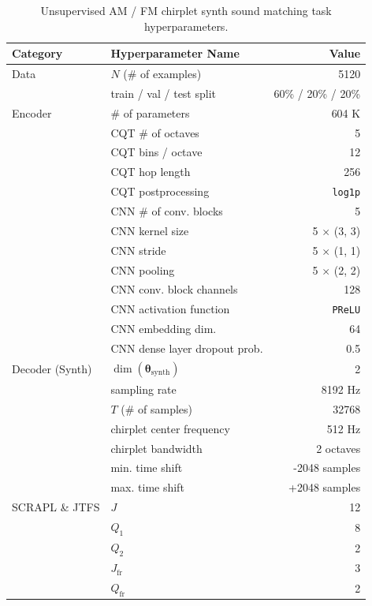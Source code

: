 \documentclass{article} %
\theoremstyle{plain}
\theoremstyle{definition}
\theoremstyle{remark}
\begin{document}
\begin{table}[H]
\centering
\caption{Unsupervised AM / FM chirplet synth sound matching task hyperparameters.}
\label{tab:chirplet_hyperparams}
\vspace{3pt}
\begin{tabular}{
    llr
}
    \toprule
    \bf{Category} & \bf{Hyperparameter Name} & \bf{Value} \\
    \midrule
    Data & $N$ (\# of examples) & 5120 \\
    & train / val / test split & 60\% / 20\% / 20\% \\
    \midrule
    Encoder & \# of parameters & 604 K \\
    & CQT \# of octaves & 5 \\
    & CQT bins / octave & 12 \\
    & CQT hop length & 256 \\
    & CQT postprocessing & \texttt{log1p} \\
    & CNN \# of conv. blocks & 5 \\
    & CNN kernel size & 5 $\times$ (3, 3) \\
    & CNN stride & 5 $\times$ (1, 1) \\
    & CNN pooling & 5 $\times$ (2, 2) \\
    & CNN conv. block channels & 128 \\
    & CNN activation function & \texttt{PReLU} \\
    & CNN embedding dim. & 64 \\
    & CNN dense layer dropout prob. & 0.5 \\
    \midrule
    Decoder (Synth) & $\dim(\boldsymbol{\theta_{\mathrm{synth}}})$ & 2 \\
    & sampling rate & 8192 Hz \\
    & $T$ (\# of samples) & 32768 \\
    & chirplet center frequency & 512 Hz \\
    & chirplet bandwidth & 2 octaves \\
    & min. time shift & -2048 samples \\
    & max. time shift & +2048 samples \\
    \midrule
    SCRAPL \& JTFS & $J$ & 12 \\
    & $Q_1$ & 8 \\
    & $Q_2$ & 2 \\
    & $J_{\mathrm{fr}}$ & 3 \\
    & $Q_{\mathrm{fr}}$ & 2 \\

\end{tabular}
\end{table}
\end{document}
